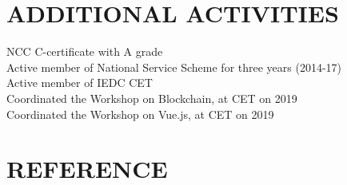 \documentclass[margin]{res}
\begin{document}
\begin{resume}
\section{ADDITIONAL ACTIVITIES}
    \textbullet{} NCC C-certificate with A grade \\
    \textbullet{} Active member of National Service Scheme for three years (2014-17) \\
    \textbullet{} Active member of IEDC CET \\
    \textbullet{} Coordinated the Workshop on Blockchain, at CET on 2019 \\
    \textbullet{} Coordinated the Workshop on Vue.js, at CET on 2019 

\section{REFERENCE}
    \sl {}
\end{resume}
\end{document}
